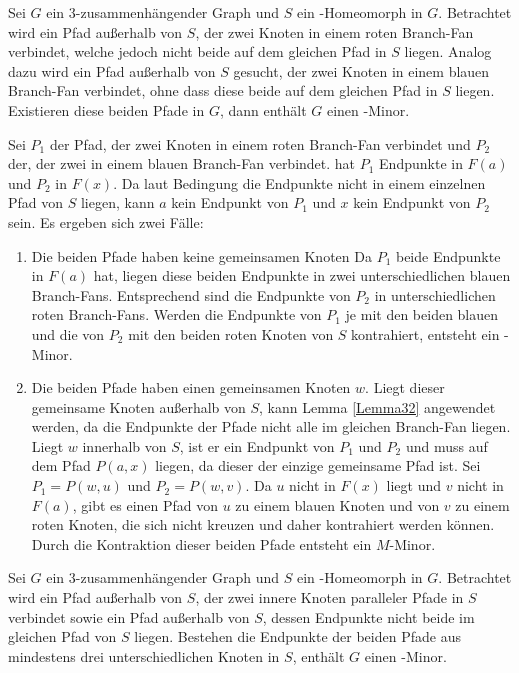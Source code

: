 \begin{lemma}\label{Lemma33}
  Sei $G$ ein $3$-zusammenhängender Graph und $S$ ein \kdd-Homeomorph in $G$.
  Betrachtet wird ein Pfad außerhalb von $S$, der zwei Knoten in einem roten Branch-Fan verbindet, welche jedoch nicht beide auf dem gleichen Pfad in $S$ liegen.
  Analog dazu wird ein Pfad außerhalb von $S$ gesucht, der zwei Knoten in einem blauen Branch-Fan verbindet, ohne dass diese beide auf dem gleichen Pfad in $S$ liegen.
  Existieren diese beiden Pfade in $G$, dann enthält $G$ einen \kf-Minor.
\end{lemma}
\begin{beweis}
  Sei $P_1$ der Pfad, der zwei Knoten in einem roten Branch-Fan verbindet und $P_2$ der, der zwei in einem blauen Branch-Fan verbindet.
  \OBdA hat $P_1$ Endpunkte in $F(a)$ und $P_2$ in $F(x)$.
  Da laut Bedingung die Endpunkte nicht in einem einzelnen Pfad von $S$ liegen, kann $a$ kein Endpunkt von $P_1$ und $x$ kein Endpunkt von $P_2$ sein.
  Es ergeben sich zwei Fälle:
  \begin{enumerate}
    \item Die beiden Pfade haben keine gemeinsamen Knoten
          Da $P_1$ beide Endpunkte in $F(a)$ hat, liegen diese beiden Endpunkte in zwei unterschiedlichen blauen Branch-Fans.
          Entsprechend sind die Endpunkte von $P_2$ in unterschiedlichen roten Branch-Fans.
          Werden die Endpunkte von $P_1$ je mit den beiden blauen und die von $P_2$ mit den beiden roten Knoten von $S$ kontrahiert, entsteht ein \kf-Minor. %
    \item Die beiden Pfade haben einen gemeinsamen Knoten $w$.
          Liegt dieser gemeinsame Knoten außerhalb von $S$, kann Lemma \ref{Lemma32} angewendet werden, da die Endpunkte der Pfade nicht alle im gleichen Branch-Fan liegen.
          Liegt $w$ innerhalb von $S$, ist er ein Endpunkt von $P_1$ und $P_2$ und muss auf dem Pfad $P(a, x)$ liegen, da dieser der einzige gemeinsame Pfad ist.
          Sei $P_1 = P(w, u)$ und $P_2 = P(w, v)$.
          Da $u$ nicht in $F(x)$ liegt und $v$ nicht in $F(a)$, gibt es einen Pfad von $u$ zu einem blauen Knoten und von $v$ zu einem roten Knoten, die sich nicht kreuzen und daher kontrahiert werden können.
          Durch die Kontraktion dieser beiden Pfade entsteht ein $M$-Minor. %
  \end{enumerate}
\end{beweis}

\begin{lemma}\label{Lemma34}
  Sei $G$ ein $3$-zusammenhängender Graph und $S$ ein \kdd-Homeomorph in $G$.
  Betrachtet wird ein Pfad außerhalb von $S$, der zwei innere Knoten paralleler Pfade in $S$ verbindet sowie ein Pfad außerhalb von $S$, dessen Endpunkte nicht beide im gleichen Pfad von $S$ liegen.
  Bestehen die Endpunkte der beiden Pfade aus mindestens drei unterschiedlichen Knoten in $S$, enthält $G$ einen \kf-Minor.
\end{lemma}

